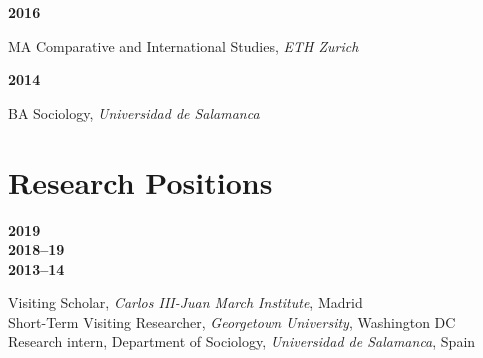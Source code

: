 \documentclass[a4paper, 12pt]{article}
\begin{document}
\vspace{10pt}

\noindent
\begin{minipage}[t]{0.1\textwidth}
  \flushleft
	\textbf{2016}
\end{minipage}
\begin{minipage}[t]{0.9\textwidth}
  MA Comparative and International Studies, \textit{ETH Zurich}
\end{minipage}


\noindent
\begin{minipage}[t]{0.1\textwidth}
  \flushleft
	\textbf{2014}
\end{minipage}
\begin{minipage}[t]{0.9\textwidth}
  BA Sociology, \textit{Universidad de Salamanca}
\end{minipage}

\vspace{0pt}
\section*{Research Positions}

\begin{minipage}[t]{0.1\textwidth}
  \flushleft
  \textbf{2019}\\\vspace{7pt}
	\textbf{2018--19}\\\vspace{7pt}
	\textbf{2013--14}
\end{minipage}
\begin{minipage}[t]{0.9\textwidth}
  Visiting Scholar, {\it Carlos III-Juan March Institute}, Madrid\vspace{2pt}\\
	Short-Term Visiting Researcher, {\it Georgetown University}, Washington DC\vspace{2pt}\\
	Research intern, Department of Sociology, {\it Universidad de Salamanca}, Spain
\end{minipage}
\end{document}
